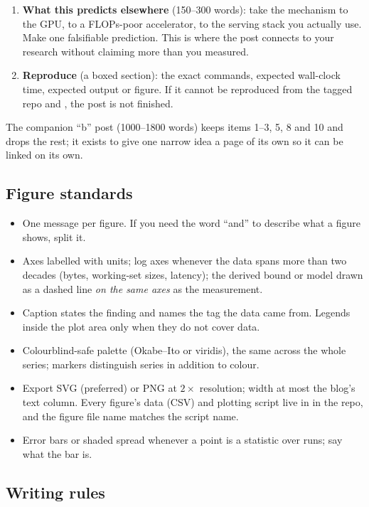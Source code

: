\begin{enumerate}
  \item \textbf{What this predicts elsewhere} (150--300 words): take the mechanism to the GPU, to a FLOPs-poor accelerator, to the serving stack you actually use. Make one falsifiable prediction. This is where the post connects to your research without claiming more than you measured.
  \item \textbf{Reproduce} (a boxed section): the exact commands, expected wall-clock time, expected output or figure. If it cannot be reproduced from the tagged repo and , the post is not finished.
\end{enumerate}

The companion ``b'' post (1000--1800 words) keeps items 1--3, 5, 8 and 10 and drops the rest; it exists to give one narrow idea a page of its own so it can be linked on its own.

\subsection{Figure standards}

\begin{itemize}
  \item One message per figure. If you need the word ``and'' to describe what a figure shows, split it.
  \item Axes labelled with units; log axes whenever the data spans more than two decades (bytes, working-set sizes, latency); the derived bound or model drawn as a dashed line \emph{on the same axes} as the measurement.
  \item Caption states the finding and names the tag the data came from. Legends inside the plot area only when they do not cover data.
  \item Colourblind-safe palette (Okabe--Ito or viridis), the same across the whole series; markers distinguish series in addition to colour.
  \item Export SVG (preferred) or PNG at $2\times$ resolution; width at most the blog's text column. Every figure's data (CSV) and plotting script live in  in the repo, and the figure file name matches the script name.
  \item Error bars or shaded spread whenever a point is a statistic over runs; say what the bar is.
\end{itemize}

\subsection{Writing rules}


